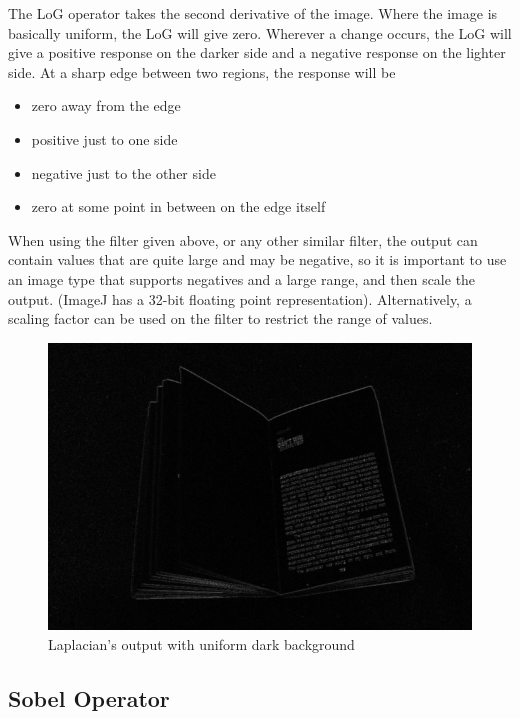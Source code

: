 \documentclass[BTech]{srmuthesis}
\begin{document}
The LoG operator takes the second derivative of the image. Where the image is basically uniform, the LoG will give zero. Wherever a change occurs, the LoG will give a positive response on the darker side and a negative response on the lighter side. At a sharp edge between two regions, the response will be

\begin{itemize}
    \item zero away from the edge
	\item positive just to one side
	\item negative just to the other side
	\item zero at some point in between on the edge itself
\end{itemize}
 
When using the filter given above, or any other similar filter, the output can contain values that are quite large and may be negative, so it is important to use an image type that supports negatives and a large range, and then scale the output. (ImageJ has a 32-bit floating point representation). Alternatively, a scaling factor can be used on the filter to restrict the range of values.

\begin{figure}[h!]
    \centering
    \includegraphics[width=15cm\textwidth]{laplace_640x480}
    \caption{Laplacian's output with uniform dark background}
    \label{fig:Laplacian's output with uniform dark background}
\end{figure}

\subsection{Sobel Operator}
\end{document}
